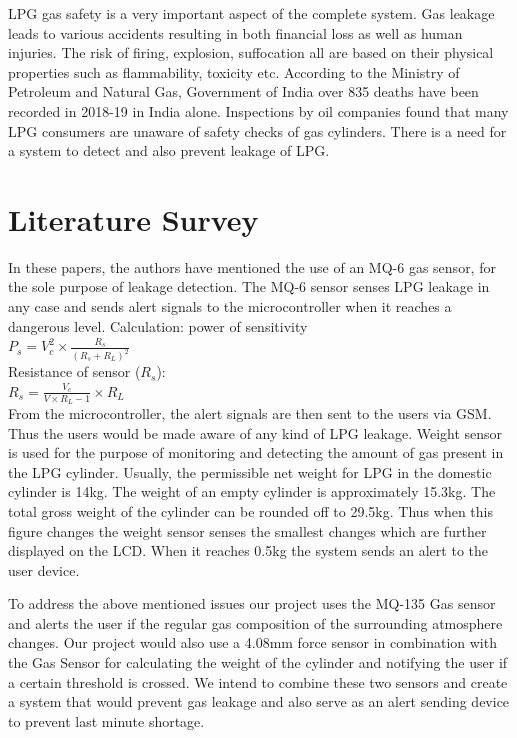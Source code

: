 \documentclass[conference]{IEEEtran}
\begin{document}
LPG gas safety is a very important aspect of the
complete system. Gas leakage leads to various accidents
resulting in both financial loss as well as human
injuries.\cite{[6]} The risk of firing, explosion, suffocation
all are based on their physical properties such as
flammability, toxicity etc. According to the Ministry
of Petroleum and Natural Gas, Government of India
over 835 deaths have been recorded in 2018-19 in
India alone.\cite{[7]} Inspections by oil companies found that
many LPG consumers are unaware of safety checks of gas
cylinders. There is a need for a system to detect and
also prevent leakage of LPG.

\section{Literature Survey}
In these papers, the authors have mentioned the
use of an MQ-6 gas sensor, for the sole purpose
of leakage detection.\cite{[1]} The MQ-6 sensor senses LPG
leakage in any case and sends alert signals to the
microcontroller when it reaches a dangerous level.
Calculation: power of sensitivity\\[0.3em]
$P_s = V_c^2 \times \frac{R_s}{(R_s+R_L)^2}$\\[0.3em]
Resistance of sensor ($R_s$):\\[0.3em]
$R_s=\frac{V_c}{V\times R_L - 1}\times R_L$ \cite{[3]}\cite{[4]}\\
From the microcontroller, the alert signals are then
sent to the users via GSM.\cite{[2]} Thus the users would be
made aware of any kind of LPG leakage. Weight sensor
is used for the purpose of monitoring and detecting
the amount of gas present in the LPG cylinder.\cite{[3]}
Usually, the permissible net weight for LPG in the
domestic cylinder is 14kg. The weight of an empty
cylinder is approximately 15.3kg. The total gross
weight of the cylinder can be rounded off to
29.5kg. Thus when this figure changes the weight
sensor senses the smallest changes which are
further displayed on the LCD. When it reaches
0.5kg the system sends an alert to the user
device.\cite{[4]}

To address the above mentioned issues our project
uses the MQ-135 Gas sensor and alerts the user if the
regular gas composition of the surrounding atmosphere
changes. Our project would also use a 4.08mm force
sensor in combination with the Gas Sensor for
calculating the weight of the cylinder and notifying
the user if a certain threshold is crossed.\cite{[11]}
We intend to combine these two sensors and create a
system that would prevent gas leakage and also serve
as an alert sending device to prevent last minute
shortage.
\end{document}
